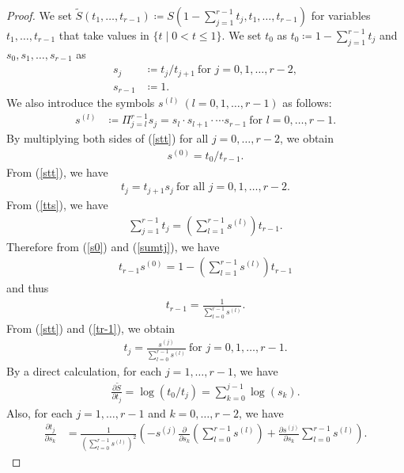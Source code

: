 \documentclass[12pt]{article}
\theoremstyle{definition}
\begin{document}
\begin{proof}
We set $\widetilde{S}(t_1,\dots, t_{r-1})\coloneqq S(1-\sum_{j=1}^{r-1}t_j, t_1,\dots, t_{r-1})$ for variables $t_1,\dots, t_{r-1}$ that take values in $\{t\mid 0<t\leq 1\}$. We set $t_0$ as $t_0\coloneqq 1-\sum_{j=1}^{r-1}t_j$ and $s_0, s_1, \dots, s_{r-1}$ as 
\begin{align}
s_j&\coloneqq t_j/t_{j+1} \ \text{for $j=0,1, \dots, r-2$}, \label{stt} \\
s_{r-1}&\coloneqq 1.
\end{align}
We also introduce the symbols $s^{(l)}\ (l=0,1,\dots, r-1)$ as follows:
\begin{align*}
s^{(l)}&\coloneqq \Pi_{j=l}^{r-1}s_j=s_l\cdot s_{l+1}\cdot\cdots s_{r-1} \ \text{for $l=0,\dots, r-1$}.
\end{align*}
By multiplying both sides of (\ref{stt}) for all $j=0,\dots, r-2$, we obtain
\begin{align}
s^{(0)}=t_0/t_{r-1}. \label{s0}
\end{align}
From (\ref{stt}), we have
\begin{align}
t_j=t_{j+1}s_j \ \text{for all $j=0,1,\dots, r-2$}. \label{tts}
\end{align}
From (\ref{tts}), we have
\begin{align}
\sum_{j=1}^{r-1}t_j=\left(\sum_{l=1}^{r-1}s^{(l)}\right)t_{r-1}. \label{sumtj}
\end{align}
Therefore from (\ref{s0}) and (\ref{sumtj}), we have
\begin{align*}
t_{r-1}s^{(0)}=1-\left(\sum_{l=1}^{r-1}s^{(l)}\right)t_{r-1}
\end{align*}
and thus
\begin{align}
t_{r-1}=\frac{1}{\sum_{l=0}^{r-1}s^{(l)}}. \label{tr-1}
\end{align}
From (\ref{stt}) and (\ref{tr-1}), we obtain
\begin{align}
t_j=\frac{s^{(j)}}{\sum_{l=0}^{r-1}s^{(l)}} \ \text{for $j=0,1,\dots, r-1$}.
\end{align}
By a direct calculation, for each $j=1,\dots, r-1$, we have
\begin{align}
\frac{\partial\widetilde{S}}{\partial t_j}=\log(t_0/t_j)=\sum_{k=0}^{j-1}\log(s_k).
\end{align}
Also, for each $j=1,\dots, r-1$ and $k=0,\dots, r-2$, we have
\begin{align}
\frac{\partial t_j}{\partial s_k}&=\frac{1}{(\sum_{l=0}^{r-1}s^{(l)})^2}\left(-s^{(j)}\frac{\partial}{\partial s_k}\left(\sum_{l=0}^{r-1}s^{(l)}\right)+\frac{\partial s^{(j)}}{\partial s_k}\sum_{l=0}^{r-1}s^{(l)}\right). \label{tjsk}

\end{align}
\end{proof}
\end{document}
